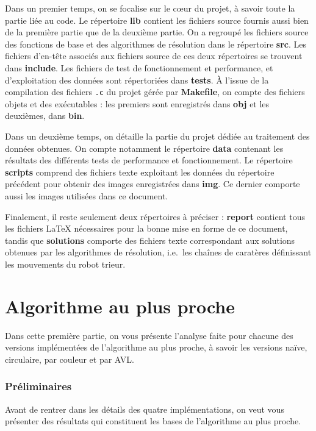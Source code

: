 \documentclass[12pt,a4paper]{article}
\begin{document}
Dans un premier temps, on se focalise sur le c\oe ur du projet, \`a 
savoir toute la partie li\'ee au code. Le r\'epertoire {\bfseries lib} contient 
les fichiers source fournis aussi bien de la premi\`ere partie que de la 
deuxi\`eme partie. On a regroup\'e les fichiers source des fonctions de base et 
des algorithmes de r\'esolution dans le r\'epertoire {\bfseries src}. Les 
fichiers d'en-t\^ete associ\'es aux fichiers source de ces deux r\'epertoires se 
trouvent dans {\bfseries include}. Les fichiers de test de fonctionnement et 
performance, et d'exploitation des donn\'ees sont r\'epertori\'ees dans 
{\bfseries tests}. \`A l'issue de la compilation des fichiers \texttt{.c} du 
projet g\'er\'ee par {\bfseries Makefile}, on compte des fichiers objets et des 
ex\'ecutables : les premiers sont enregistr\'es dans {\bfseries obj} et les 
deuxi\`emes, dans {\bfseries bin}. 

Dans un deuxi\`eme temps, on d\'etaille la partie du projet d\'edi\'ee au 
traitement des donn\'ees obtenues. On compte notamment le r\'epertoire 
{\bfseries data} contenant les r\'esultats des diff\'erents tests de performance 
et fonctionnement. Le r\'epertoire {\bfseries scripts} comprend des fichiers 
texte exploitant les donn\'ees du r\'epertoire pr\'ec\'edent pour obtenir des 
images enregistr\'ees dans {\bfseries img}. Ce dernier comporte aussi les 
images utilis\'ees dans ce document.

Finalement, il reste seulement deux r\'epertoires \`a pr\'eciser : {\bfseries 
report} contient tous les fichiers \LaTeX{} n\'ecessaires pour la bonne mise en 
forme de ce document, tandis que {\bfseries solutions} comporte des fichiers 
texte correspondant aux solutions obtenues par les algorithmes de r\'esolution, 
i.e.\ les cha\^ines de carat\`eres d\'efinissant les mouvements du robot
 trieur.


\newpage

\part{Algorithme au plus proche}
Dans cette premi\`ere partie, on vous pr\'esente l'analyse faite pour chacune 
des versions impl\'ement\'ees de l'algorithme au plus proche, \`a savoir les 
versions na\"ive, circulaire, par couleur et par AVL.

\section{Pr\'eliminaires}
Avant de rentrer dans les d\'etails des quatre impl\'ementations, on 
veut vous pr\'esenter des r\'esultats qui constituent les bases de 
l'algorithme au plus proche.
\end{document}
